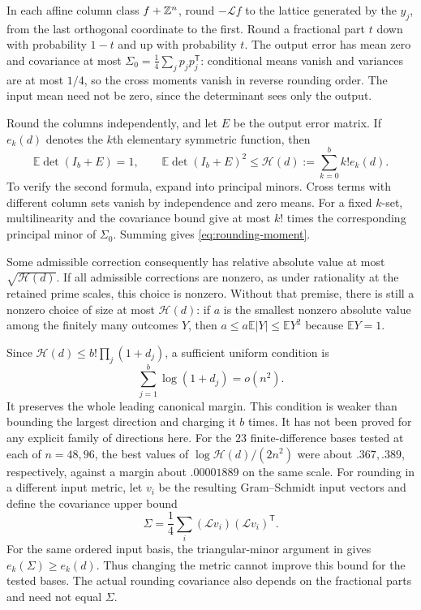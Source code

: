 In each affine column class $f+\mathbb Z^n$, round $-\mathcal Lf$ to the
lattice generated by the $y_j$, from the last orthogonal coordinate
to the first. Round a fractional part $t$ down with probability $1-t$
and up with probability $t$. The output error has mean zero and
covariance at most $\Sigma_0=\frac14\sum_jp_jp_j^{\mathsf T}$:
conditional means vanish and variances are at most $1/4$, so the cross
moments vanish in reverse rounding order. The input mean need not be
zero, since the determinant sees only the output.

Round the columns independently, and let $E$ be the output error
matrix. If $e_k(d)$ denotes the $k$th elementary symmetric function,
then
\begin{equation}\label{eq:rounding-moment}
 \mathbb E\det(I_b+E)=1,\qquad
 \mathbb E\det(I_b+E)^2\le\mathcal H(d):=\sum_{k=0}^b k!e_k(d).
\end{equation}
To verify the second formula, expand into principal minors. Cross
terms with different column sets vanish by independence and zero
means. For a fixed $k$-set, multilinearity and the covariance bound
give at most $k!$ times the corresponding principal minor of
$\Sigma_0$. Summing gives \eqref{eq:rounding-moment}.

Some admissible correction consequently has relative absolute value
at most $\sqrt{\mathcal H(d)}$. If all admissible corrections are
nonzero, as under rationality at the retained prime scales, this
choice is nonzero. Without that premise, there is still a nonzero
choice of size at most $\mathcal H(d)$: if $a$ is the smallest nonzero
absolute value among the finitely many outcomes $Y$, then
$a\le a\mathbb E|Y|\le\mathbb EY^2$ because $\mathbb EY=1$.

Since $\mathcal H(d)\le b!\prod_j(1+d_j)$, a sufficient uniform
condition is
\begin{equation}\label{eq:rounding-target}
 \sum_{j=1}^b\log(1+d_j)=o(n^2).
\end{equation}
It preserves the whole leading canonical margin. This condition is
weaker than bounding the largest direction and charging it $b$ times.
It has not been proved for any explicit family of directions here.
For the $23$ finite-difference bases tested at each of $n=48,96$, the
best values of $\log\mathcal H(d)/(2n^2)$ were about $.367,.389$,
respectively, against a margin about $.00001889$ on the same scale.
For rounding in a different input metric, let $v_i$ be the resulting
Gram--Schmidt input vectors and define the covariance upper bound
\[
 \Sigma=\frac14\sum_i(\mathcal L v_i)(\mathcal L v_i)^{\mathsf T}.
\]
For the same ordered input basis, the triangular-minor argument in
 gives $e_k(\Sigma)\ge e_k(d)$. Thus changing the metric cannot
improve this bound for the tested bases. The actual rounding covariance
also depends on the fractional parts and need not equal $\Sigma$.

